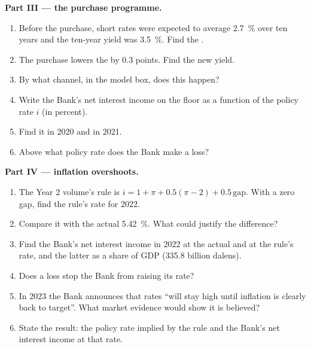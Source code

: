 \begin{problem}
\medskip\noindent\textbf{Part III --- the purchase programme.}
\begin{enumerate}[resume]
\item Before the purchase, short rates were expected to average 2.7~\% over ten years
and the ten-year yield was 3.5~\%. Find the .
\item The purchase lowers the  by 0.3 points. Find the new yield.
\item By what channel, in the model box, does this happen?
\item Write the Bank's net interest income on the floor as a function of the policy
rate $i$ (in percent).
\item Find it in 2020 and in 2021.
\item Above what policy rate does the Bank make a loss?
\end{enumerate}

\medskip\noindent\textbf{Part IV --- inflation overshoots.}
\begin{enumerate}[resume]
\item The Year 2 volume's rule is $i = 1 + \pi + 0.5(\pi - 2) + 0.5\,\text{gap}$. With a zero gap, find
the rule's rate for 2022.
\item Compare it with the actual 5.42~\%. What could justify the difference?
\item Find the Bank's net interest income in 2022 at the actual and at the rule's
rate, and the latter as a share of GDP (335.8 billion dalens).
\item Does a loss stop the Bank from raising its rate?
\item In 2023 the Bank announces that rates ``will stay high until inflation is
clearly back to target''. What market evidence would show it is believed?
\item State the result: the policy rate implied by the rule and the Bank's net
interest income at that rate.
\end{enumerate}
\end{problem}
